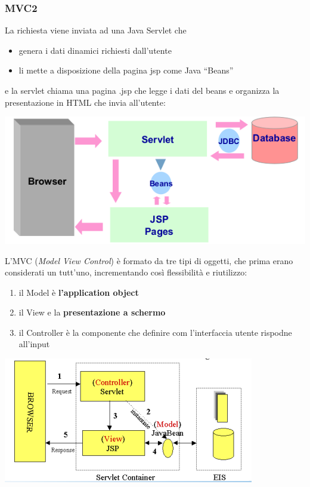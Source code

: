 \message{ !name(sd.tex)}\documentclass[a4paper,12pt, oneside]{book}
\begin{document}
\subsubsection{MVC2}
La richiesta viene inviata ad una Java Servlet che
\begin{itemize}
	\item genera i dati dinamici richiesti dall’utente
	\item li mette a disposizione della pagina jsp come Java “Beans”
\end{itemize}
e la servlet chiama una pagina .jsp che legge i dati del beans e organizza la presentazione in HTML che invia all'utente:
\begin{center}
	\includegraphics[scale=0.7]{img/mvc2.png}
\end{center}
L'MVC (\textit{Model View Control}) è formato da tre tipi di oggetti, che prima erano considerati un tutt'uno, incrementando così flessibilità e riutilizzo:
\begin{enumerate}
	\item il Model è \textbf{l'application object}
	\item il View e la \textbf{presentazione a schermo}
	\item il Controller è la componente che definire com l'interfaccia utente rispodne all'input
\end{enumerate}
\begin{center}
	\includegraphics[scale=0.7]{img/mvc22.png}
\end{center}
\end{document}

